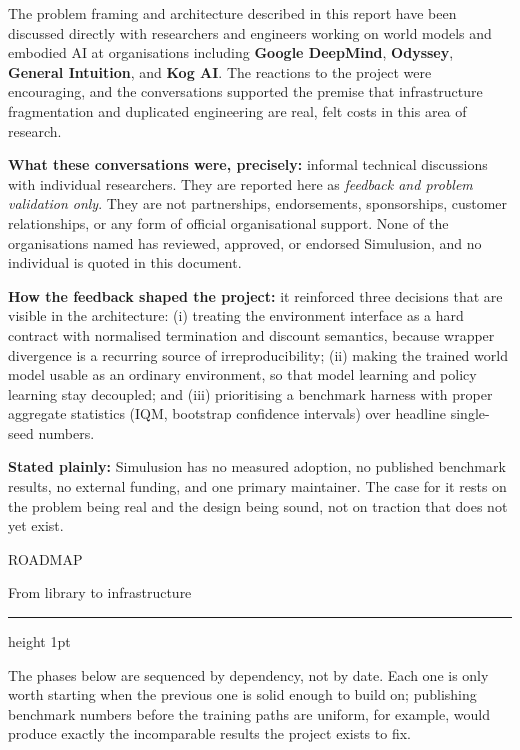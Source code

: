 \documentclass[10pt,a4paper]{article}
\newcommand{\kicker}[1]{{\footnotesize\displayfont\color{accent}\MakeUppercase{#1}}}
\newcommand{\pagetitle}[2]{%
  \kicker{#1}\par\vspace{1.5mm}
  {\Huge\displayfont\color{ink} #2}\par\vspace{2.5mm}
  {\color{rule}\hrule height 1pt}\par\vspace{4mm}}
\begin{document}
\begin{callout}
{\footnotesize
The problem framing and architecture described in this report have been discussed directly with
researchers and engineers working on world models and embodied AI at organisations including
\textbf{Google DeepMind}, \textbf{Odyssey}, \textbf{General Intuition}, and \textbf{Kog AI}. The
reactions to the project were encouraging, and the conversations supported the premise that
infrastructure fragmentation and duplicated engineering are real, felt costs in this area of
research.
\vspace{2mm}

\textbf{What these conversations were, precisely:} informal technical discussions with individual
researchers. They are reported here as \emph{feedback and problem validation only}. They are not
partnerships, endorsements, sponsorships, customer relationships, or any form of official
organisational support. None of the organisations named has reviewed, approved, or endorsed
Simulusion, and no individual is quoted in this document.
\vspace{2mm}

\textbf{How the feedback shaped the project:} it reinforced three decisions that are visible in the
architecture: (i) treating the environment interface as a hard contract with normalised
termination and discount semantics, because wrapper divergence is a recurring source of
irreproducibility; (ii) making the trained world model usable as an ordinary environment, so that
model learning and policy learning stay decoupled; and (iii) prioritising a benchmark harness with
proper aggregate statistics (IQM, bootstrap confidence intervals) over headline single-seed
numbers.}
\end{callout}

\vspace{3mm}
\begin{warncallout}
{\footnotesize\textbf{Stated plainly:} Simulusion has no measured adoption, no published benchmark
results, no external funding, and one primary maintainer. The case for it rests on the problem
being real and the design being sound, not on traction that does not yet exist.}
\end{warncallout}

\newpage
\pagetitle{Roadmap}{From library to infrastructure}

{\footnotesize
The phases below are sequenced by dependency, not by date. Each one is only worth starting when the
previous one is solid enough to build on; publishing benchmark numbers before the training paths are
uniform, for example, would produce exactly the incomparable results the project exists to fix.}
\end{document}
